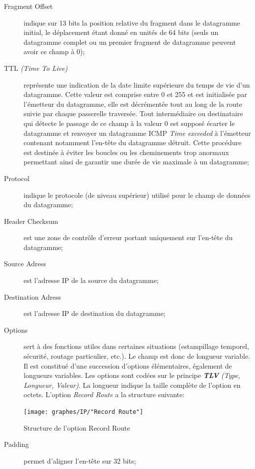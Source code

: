 \documentclass[11pt,english,french]{scrreprt}
\theoremstyle{remark}
\theoremstyle{definition}
\begin{document}
\begin{description}
	\item [Fragment Offset] indique sur 13 bits la position relative du fragment dans le datagramme initial, le déplacement étant donné en unités de 64 bits (seuls un datagramme complet ou un premier fragment de datagramme peuvent avoir ce champ à 0);
	\item [TTL \emph{(Time To Live)}] représente une indication de la date limite supérieure du temps de vie d'un datagramme. Cette valeur est comprise entre 0 et 255 et est initialisée par l'émetteur du datagramme, elle est décrémentée tout au long de la route suivie par chaque passerelle traversée. Tout intermédiaire ou destinataire qui détecte le passage de ce champ à la valeur 0 est supposé écarter le datagramme et renvoyer un datagramme ICMP \emph{Time exceeded} à l'émetteur contenant notamment l'en-tête du datagramme détruit. Cette procédure est destinée à éviter les boucles ou les cheminements trop anormaux permettant ainsi de garantir une durée de vie maximale à un datagramme;
	\item [Protocol] indique le protocole (de niveau supérieur) utilisé pour le champ de données du datagramme;
	\item [Header Checksum] est une zone de contrôle d'erreur portant uniquement sur l'en-tête du datagramme;
	\item [Source Adress] est l'adresse IP de la source du datagramme;
	\item [Destination Adress] est l'adresse IP de destination du datagramme;
	\item [Options] sert à des fonctions utiles dans certaines situations (estampillage temporel, sécurité, routage particulier, etc.). Le champ est donc de longueur variable. Il est constitué d'une succession d'options élémentaires, également de longueurs variables. Les options sont codées sur le principe \emph{\textbf{TLV} (Type, Longueur, Valeur)}. La longueur indique la taille complète de l'option en octets. L'option \emph{Record Route} a la structure suivante:
\end {description}
\begin{figure}[h!]
	\center
	\texttt{[image: graphes/IP/"Record Route"]}
	\caption{Structure de l'option Record Route}
\end{figure}
\begin{description}
	\item [Padding] permet d'aligner l'en-tête sur 32 bits;
\end {description}
\end{document}

